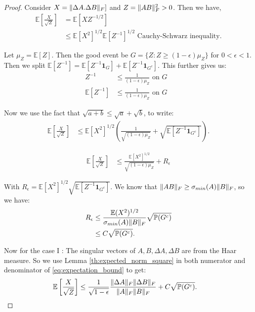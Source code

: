 \documentclass[onefignum,onetabnum]{siamart171218}
\DeclarePairedDelimiter\norm{\lVert}{\rVert}
\begin{document}
\begin{proof}
    Consider $X = \norm{\Delta A.\Delta B}_F]$ and $Z =  \norm{AB}^2_F >0$.
    Then we have, 
    \begin{align*}
        \mathbb{E}\left[ \frac{X}{\sqrt{Z}}\right] & = \mathbb{E}[X Z^{-1/2}] \\
        &\leq \mathbb{E}[X^2]^{1/2} \mathbb{E}[Z^{-1}]^{1/2}  \text{ Cauchy-Schwarz inequality.}
    \end{align*}

Let $\mu_Z = \mathbb{E}[Z]$. Then the good event be $G = \{ Z : Z \geq (1-\epsilon) \mu_Z \}$ for $0 < \epsilon < 1$.  
Then we split $\mathbb{E}[Z^{-1}] = \mathbb{E}[Z^{-1} \mathbf{1}_G] + \mathbb{E}[Z^{-1} \mathbf{1}_{G^c}]$. 
This further gives us:
\begin{align*}
    Z^{-1} &\leq \frac{1}{(1-\epsilon) \mu_Z}  \text{       on $G$ }\\
    \mathbb{E}[Z^{-1}] &\leq \frac{1}{(1-\epsilon) \mu_Z}  \text{       on $G$ }
\end{align*}

Now we use the fact that $\sqrt{a+b} \leq \sqrt{a} + \sqrt{b}$, to write:
\begin{align}
    \mathbb{E}\left[ \frac{X}{\sqrt{Z}}\right]  &\leq \mathbb{E}[X^2]^{1/2} \left(  \frac{1}{\sqrt{(1-\epsilon) \mu_Z}} + \sqrt{\mathbb{E}[Z^{-1} \mathbf{1}_{G^c}]} \right). \label{expectineq} 
\end{align}

\begin{align}   \mathbb{E}\left[\frac{X}{\sqrt{Z}}\right]  &\leq  \frac{\mathbb{E}[X^2]^{1/2}}{\sqrt{(1-\epsilon) \mu_Z}}  + R_\epsilon \label{eq:expectation_bound}
\end{align}

With $R_{\epsilon} = \mathbb{E}[X^2]^{1/2}\sqrt{\mathbb{E}[Z^{-1} \mathbf{1}_{G^c}]}$. We know that $\norm{AB}_F \geq \sigma_{min}(A) \norm{B}_F$, so we have:
\begin{align*}
    R_\epsilon &\leq \frac{\mathbb{E}(X^2)^{1/2}}{\sigma_{min}(A) \norm{B}_F} \sqrt{\mathbb{P}(G^c)}  \\
    &\leq C \sqrt{\mathbb{P}(G^c)}.
\end{align*}

Now for the case I : The singular vectors of $A, B, \Delta A, \Delta B$ are from the Haar measure. So we use Lemma \ref{th:expected_norm_square} in both numerator and denominator of \eqref{eq:expectation_bound} to get:
\begin{align}
    \mathbb{E}\left[ \frac{X}{\sqrt{Z}}\right]  &\leq \frac{1}{\sqrt{1-\epsilon}} \frac{\norm{\Delta A}_F \norm{\Delta B}_F}{ \norm{A}_F \norm{B}_F } + C \sqrt{\mathbb{P}(G^c)}.
\end{align}


\end{proof}
\end{document}
